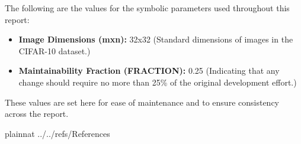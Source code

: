 \documentclass[12pt]{article}
\begin{document}

The following are the values for the symbolic parameters used throughout this report:

\begin{itemize}
  \item \textbf{Image Dimensions (mxn):} 32x32 (Standard dimensions of images in the CIFAR-10 dataset.)

  \item \textbf{Maintainability Fraction (FRACTION):} 0.25 (Indicating that any change should require no more than 25\% of the original development effort.)

\end{itemize}
These values are set here for ease of maintenance and to ensure consistency across the report.

\newpage

 {plainnat}
 {../../refs/References}



\end{document}
